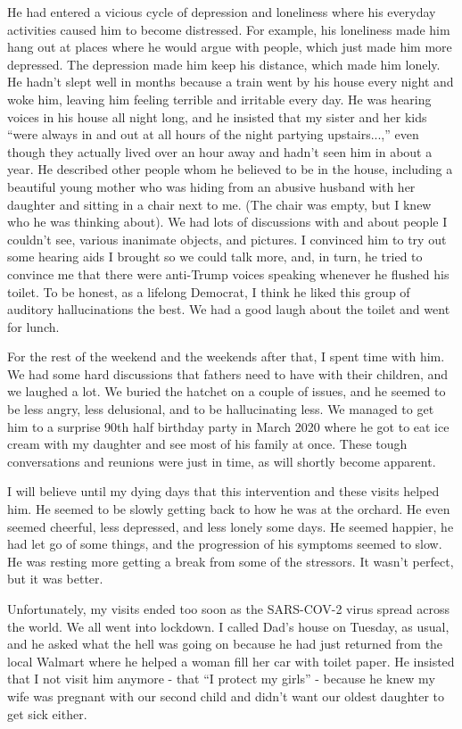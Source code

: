 \documentclass{article}
\begin{document}
He had entered a vicious cycle of depression and loneliness where his everyday activities caused him to become distressed. For example, his loneliness made him hang out at places where he would argue with people, which just made him more depressed. The depression made him keep his distance, which made him lonely. He hadn't slept well in months because a train went by his house every night and woke him, leaving him feeling terrible and irritable every day. He was hearing voices in his house all night long, and he insisted that my sister and her kids ``were always in and out at all hours of the night partying upstairs...,'' even though they actually lived over an hour away and hadn't seen him in about a year. He described other people whom he believed to be in the house, including a beautiful young mother who was hiding from an abusive husband with her daughter and sitting in a chair next to me. (The chair was empty, but I knew who he was thinking about).  We had lots of discussions with and about people I couldn't see, various inanimate objects, and pictures. I convinced him to try out some hearing aids I brought so we could talk more, and, in turn, he tried to convince me that there were anti-Trump voices speaking whenever he flushed his toilet. To be honest, as a lifelong Democrat, I think he liked this group of auditory hallucinations the best. We had a good laugh about the toilet and went for lunch.

For the rest of the weekend and the weekends after that, I spent time with him. We had some hard discussions that fathers need to have with their children, and we laughed a lot. We buried the hatchet on a couple of issues, and he seemed to be less angry, less delusional, and to be hallucinating less. We managed to get him to a surprise 90th half birthday party in March 2020 where he got to eat ice cream with my daughter and see most of his family at once. These tough conversations and reunions were just in time, as will shortly become apparent.

I will believe until my dying days that this intervention and these visits helped him. He seemed to be  slowly getting back to how he was at the orchard. He even seemed cheerful, less depressed, and less lonely some days. He seemed happier, he had let go of some things, and the progression of his symptoms seemed to slow. He was resting more getting a break from some of the stressors. It wasn't perfect, but it was better.

Unfortunately, my visits ended too soon as the SARS-COV-2 virus spread across the world. We all went into lockdown. I called Dad's house on Tuesday, as usual, and he asked what the hell was going on because he had just returned from the local Walmart where he helped a woman fill her car with toilet paper. He insisted that I not visit him anymore - that ``I protect my girls'' - because he knew my wife was pregnant with our second child and didn't want our oldest daughter to get sick either.
\end{document}
